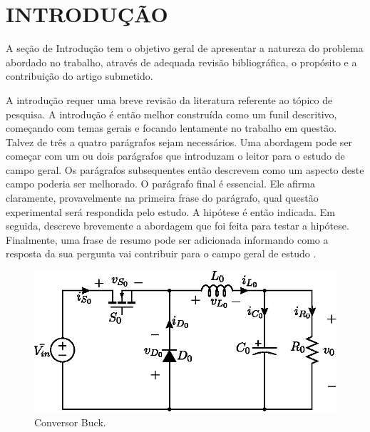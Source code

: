 %


\section{INTRODUÇÃO}


A seção de Introdução tem o objetivo geral de apresentar a natureza do problema abordado no trabalho, através de adequada revisão bibliográfica, o propósito e a contribuição do artigo submetido.

A introdução requer uma breve revisão da literatura referente ao tópico de pesquisa. A introdução é então melhor construída como um funil descritivo, começando com temas gerais e focando lentamente no trabalho em questão. Talvez de três a quatro parágrafos sejam necessários. Uma abordagem pode ser começar com um ou dois parágrafos que introduzam o leitor para o estudo de campo geral. Os parágrafos subsequentes então descrevem como um aspecto deste campo poderia ser melhorado. O parágrafo final é essencial. Ele afirma claramente, provavelmente na primeira frase do parágrafo, qual questão experimental será respondida pelo estudo. A hipótese é então indicada. Em seguida, descreve brevemente a abordagem que foi feita para testar a hipótese. Finalmente, uma frase de resumo pode ser adicionada informando como a resposta da sua pergunta vai contribuir para o campo geral de estudo .

\begin{figure}[!h]
	\centering
	\includegraphics[width=1\linewidth]{Figs/Buck}
	\caption{Conversor Buck.}
	\label{fig:buck}
\end{figure}


